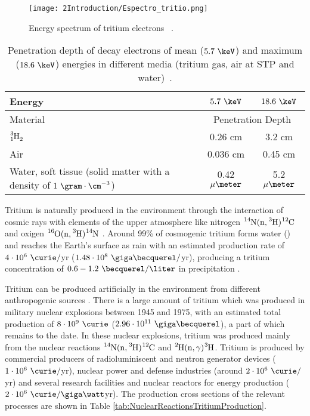 \begin{figure}[h]
\texttt{[image: 2Introduction/Espectro\_tritio.png]}
\centering
\caption{Energy spectrum of tritium electrons ~\cite{TritiumEspectrum}.\label{fig:TritiumDecaySpectrum}}
\end{figure}

\begin{table}[h]
\centering{}%
\begin{tabular}{lcc}
\toprule 
Energy & $5.7~\keV$ & $18.6~\keV$ \tabularnewline
\midrule
Material & \multicolumn{2}{c}{Penetration Depth} \tabularnewline
\midrule
\midrule 
$\ce{\ce{^{3}_{1}H_2}}$ & 0.26 cm & 3.2 cm \tabularnewline
Air & 0.036 cm & 0.45 cm \tabularnewline
\parbox{10em}{ Water, soft tissue\\  (solid matter with a \\  density of $1~\gram\cdot\cm^{-3}$)} & 0.42 $\mu\meter$ & 5.2 $\mu\meter$ \tabularnewline
\bottomrule
\end{tabular}
\caption{Penetration depth of decay electrons of mean ($5.7~\keV$) and maximum ($18.6~\keV$) energies in different media (tritium gas, air at STP and water)~\cite{MeanFreePathDocument}.}
\label{tab:MeanFreePathTritium}
\end{table} 

Tritium is naturally produced in the environment through the interaction of cosmic rays with elements of the upper atmosphere like nitrogen $\ce{^{14}N}(\ce{n},\ce{^{3}H})\ce{^{12}C}$ \cite{TritiumHandling} and oxigen $\ce{^{16}O}(\ce{n},\ce{^{3}H})\ce{^{14}N}$ \cite{OxigenTritium}. Around 99\% of cosmogenic tritium forms water () and reaches the Earth's surface as rain with an estimated production rate of $4\cdot 10^6 ~\curie/$yr ($1.48 \cdot 10^8 ~\giga\becquerel/$yr), producing a tritium concentration of $0.6-1.2~\becquerel/\liter$ in precipitation \cite{CommonEmissionTritium, TritiumHandling}. 

Tritium can be produced artificially in the environment from different anthropogenic sources \cite{CommonEmissionTritium, TritiumHandling}. There is a large amount of tritium which was produced in military nuclear explosions between 1945 and 1975, with an estimated total production of $8 \cdot 10^9~\curie$ ($2.96 \cdot 10^{11}~\giga\becquerel$), a part of which remains to the date. In these nuclear explosions, tritium was produced mainly from the nuclear reactions $\ce{^{14}N}(\ce{n},\ce{^{3}H})\ce{^{12}C}$ and $\ce{^{2}H}(\ce{n},\gamma)\ce{^{3}H}$. Tritium is produced by commercial producers of radioluminiscent and neutron generator devices ($1 \cdot 10^6~\curie/$yr), nuclear power and defense industries (around $2 \cdot 10^6~\curie/$yr) and several research facilities and nuclear reactors for energy production ($2 \cdot 10^6~\curie/\giga\watt$yr). The production cross sections of the relevant processes are shown in Table \ref{tab:NuclearReactionsTritiumProduction}.

